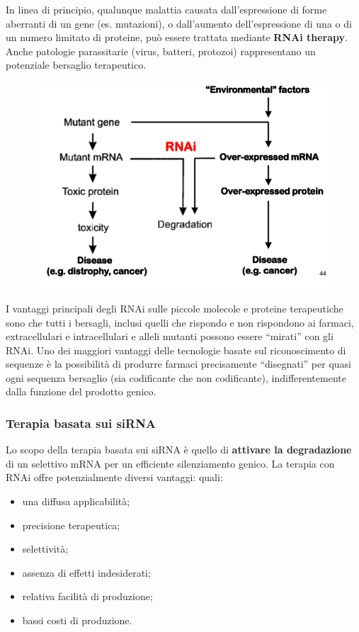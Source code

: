 \documentclass[]{article}
\begin{document}
In linea di principio, qualunque malattia causata dall'espressione di
forme aberranti di un gene (es. mutazioni), o dall'aumento
dell'espressione di una o di un numero limitato di proteine, può essere
trattata mediante \textbf{RNAi therapy}. Anche patologie parassitarie
(virus, batteri, protozoi) rappresentano un potenziale bersaglio
terapeutico.

\begin{figure}[htp]
\centering
\includegraphics[scale=1.00]{img/68_miRNA-therapy.png}
\caption{}
\label{mirna-therapy}
\end{figure}

I vantaggi principali degli RNAi sulle piccole molecole e proteine
terapeutiche sono che tutti i bersagli, inclusi quelli che rispondo e
non rispondono ai farmaci, extracellulari e intracellulari e alleli
mutanti possono essere ``mirati'' con gli RNAi. Uno dei maggiori
vantaggi delle tecnologie basate sul riconoscimento di sequenze è la
possibilità di produrre farmaci precisamente ``disegnati'' per quasi
ogni sequenza bersaglio (sia codificante che non codificante),
indifferentemente dalla funzione del prodotto genico.

\subsubsection{Terapia basata sui siRNA}\label{terapia-basata-sui-sirna}

Lo scopo della terapia basata sui siRNA è quello di \textbf{attivare la
degradazione} di un selettivo mRNA per un efficiente silenziamento
genico. La terapia con RNAi offre potenzialmente diversi vantaggi:
quali:

\begin{itemize}
\itemsep1pt\parskip0pt
\item
  una diffusa applicabilità;
\item
  precisione terapeutica;
\item
  selettività;
\item
  assenza di effetti indesiderati;
\item
  relativa facilità di produzione;
\item
  bassi costi di produzione.
\end{itemize}
\end{document}
